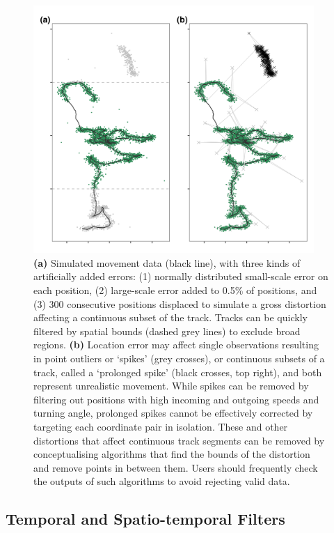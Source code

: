 \documentclass[10pt,paper=a4,headings=standardclasses
]{scrartcl}
\begin{document}
\begin{figure}[h!]
    \centering
    \includegraphics[width=0.95\textwidth]{figures/fig_02_filtering_data.png}
    \caption{\textbf{(a)} Simulated movement data (black line), with three kinds of artificially added errors: (1) normally distributed small-scale error on each position, (2) large-scale error added to 0.5\% of positions, and (3) 300 consecutive positions displaced to simulate a gross distortion affecting a continuous subset of the track.  
    Tracks can be quickly filtered by spatial bounds (dashed grey lines) to exclude broad regions.
    \textbf{(b)} 
    Location error may affect single observations resulting in point outliers or `spikes' (grey crosses), or continuous subsets of a track, called a `prolonged spike' (black crosses, top right), and both represent unrealistic movement.
    While spikes can be removed by filtering out positions with high incoming and outgoing speeds and turning angle, prolonged spikes cannot be effectively corrected by targeting each coordinate pair in isolation.
    These and other distortions that affect continuous track segments can be removed by conceptualising algorithms that find the bounds of the distortion and remove points in between them.
    Users should frequently check the outputs of such algorithms to avoid rejecting valid data.
    }
    \label{fig:figure_filtering_data}
\end{figure}

\subsection{Temporal and Spatio-temporal Filters}
\end{document}
